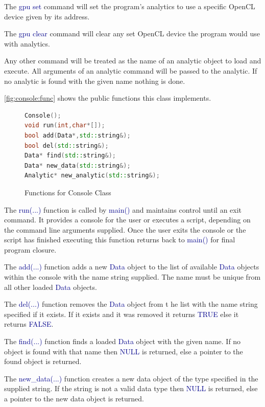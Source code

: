 \documentclass[10pt]{article}
\providecommand{\h}[1]{\textcolor{darkblue}{#1}}
\begin{document}
The \h{gpu set} command will set the program's analytics to use a specific 
OpenCL device given by its address.

The \h{gpu clear} command will clear any set OpenCL device the program would 
use with analytics.

Any other command will be treated as the name of an analytic object to load and 
execute. All arguments of an analytic command will be passed to the analytic. 
If no analytic is found with the given name nothing is done.

\autoref{fig:console:func} shows the public functions this class implements.

\begin{figure}[H]
\begin{mdframed}[style=functions]
\begin{lstlisting}[language=C++]
Console();
void run(int,char*[]);
bool add(Data*,std::string&);
bool del(std::string&);
Data* find(std::string&);
Data* new_data(std::string&);
Analytic* new_analytic(std::string&);
\end{lstlisting}
\end{mdframed}
\caption{Functions for Console Class}
\label{fig:console:func}
\end{figure}

The \h{run(...)} function is called by \h{main()} and maintains control until 
an exit command. It provides a console for the user or executes a script, 
depending on the command line arguments supplied. Once the user exits the 
console or the script has finished executing this function returns back to 
\h{main()} for final program closure.

The \h{add(...)} function adds a new \h{Data} object to the list of 
available \h{Data} objects within the console with the name string supplied. 
The name must be unique from all other loaded \h{Data} objects.

The \h{del(...)} function removes the \h{Data} object from t he list with the 
name string specified if it exists. If it exists and it was removed it returns 
\h{TRUE} else it returns \h{FALSE}.

The \h{find(...)} function finds a loaded \h{Data} object with the given name. 
If no object is found with that name then \h{NULL} is returned, else a 
pointer to the found object is returned.

The \h{new\_data(...)} function creates a new data object of the type 
specified in the supplied string. If the string is not a valid data type then 
\h{NULL} is returned, else a pointer to the new data object is returned.
\end{document}
